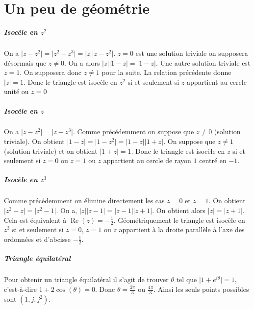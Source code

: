 \documentclass[10pt,a4paper]{article}
\begin{document}
\section{Un peu de géométrie}
\subparagraph{Isocèle en $z^2$}On a $\vert z- z^2 \vert = \vert z^2 - z^3 \vert = \vert z \vert \vert z -z^2 \vert$. $z=0$ est une solution triviale on supposera désormais que $z \neq 0$. On a alors $\vert z \vert \vert 1-z \vert = \vert 1- z \vert$. Une autre solution triviale est $z=1$. On supposera donc $z \neq 1$ pour la suite. La relation précédente donne $\vert z \vert =1$. Donc le triangle est isocèle en $z^2$ si et seulement si $z$ appartient au cercle unité ou $z=0$
\subparagraph{Isocèle en $z$} On a $\vert z -z^2 \vert = \vert z -z^3 \vert$. Comme précédemment on suppose que $z \neq 0$ (solution triviale). On obtient $\vert 1 -z \vert = \vert 1 -z^2 \vert = \vert 1-z \vert \vert 1+z \vert$. On suppose que $z \neq 1$ (solution triviale) et on obtient $\vert 1+z \vert = 1$. Donc le triangle est isocèle en $z$ si et seulement si $z=0$ ou $z=1$ ou $z$ appartient au cercle de rayon $1$ centré en $-1$.
\subparagraph{Isocèle en $z^3$}Comme précédemment on élimine directement les cas $z=0$ et $z=1$. On obtient $\vert z^2 -z \vert = \vert z^2-1 \vert$. On a, $\vert z \vert \vert z-1 \vert = \vert z-1 \vert \vert z +1\vert$. On obtient alors $\vert z \vert = \vert z+1\vert $. Cela est équivalent à $\operatorname{Re}(z) = -\frac{1}{2}$. Géométriquement le triangle est isocèle en $z^3$ si et seulement si $z=0$, $z=1$ ou $z$ appartient à la droite parallèle à l'axe des ordonnées et d'abcisse $-\frac{1}{2}$.
\subparagraph{Triangle équilatéral} Pour obtenir un triangle équilatéral il s'agit de trouver $\theta$ tel que $\vert 1 +e^{i \theta} \vert = 1$, c'est-à-dire $1+2\cos(\theta) =0$. Donc $\theta = \frac{2\pi}{3}$ ou $\frac{4\pi}{3}$. Ainsi les seuls points possibles sont $(1,j,j^2)$.
\end{document}
